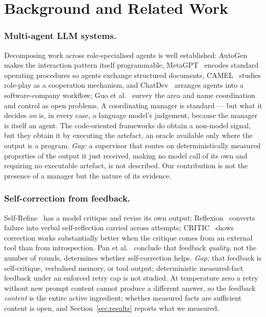 \documentclass[runningheads]{llncs}
\begin{document}
\section{Background and Related Work}
\label{sec:related}

\subsubsection{Multi-agent LLM systems.}
Decomposing work across role-specialised agents is well established:
AutoGen~\cite{autogen} makes the interaction pattern itself programmable,
MetaGPT~\cite{metagpt} encodes standard operating procedures so agents exchange
structured documents, CAMEL~\cite{camel} studies role-play as a cooperation
mechanism, and ChatDev~\cite{chatdev} arranges agents into a software-company
workflow; Guo et al.~\cite{guo2024survey} survey the area and name coordination
and control as open problems. A coordinating manager is standard --- but what it
decides \emph{on} is, in every case, a language model's judgement, because the
manager is itself an agent. The code-oriented frameworks do obtain a non-model
signal, but they obtain it by executing the artefact, an oracle available only
where the output is a program. \emph{Gap:} a supervisor that routes on
deterministically measured properties of the output it just received, making no
model call of its own and requiring no executable artefact, is not described. Our
contribution is not the presence of a manager but the nature of its evidence.

\subsubsection{Self-correction from feedback.}
Self-Refine~\cite{selfrefine} has a model critique and revise its own output;
Reflexion~\cite{reflexion} converts failure into verbal self-reflection carried
across attempts; CRITIC~\cite{critic} shows correction works substantially better
when the critique comes from an external tool than from introspection. Pan et
al.~\cite{pan2024survey} conclude that feedback \emph{quality}, not the number of
rounds, determines whether self-correction helps. \emph{Gap:} that feedback is
self-critique, verbalised memory, or tool output; deterministic measured-fact
feedback under an enforced retry cap is not studied. At temperature zero a retry
without new prompt content cannot produce a different answer, so the feedback
\emph{content} is the entire active ingredient; whether measured facts are
sufficient content is open, and Section~\ref{sec:results} reports what we
measured.
\end{document}
